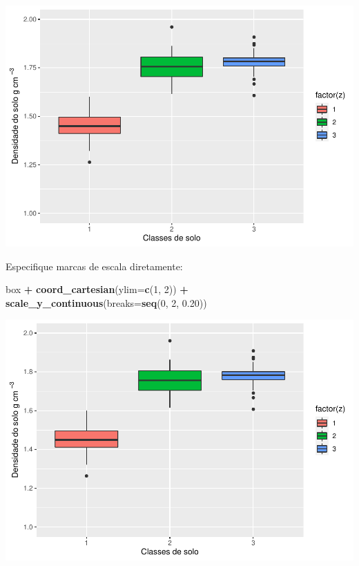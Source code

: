 \documentclass[
]{book}
\newenvironment{Shaded}{\begin{snugshade}}{\end{snugshade}}
\newcommand{\DataTypeTok}[1]{\textcolor[rgb]{0.13,0.29,0.53}{#1}}
\newcommand{\DecValTok}[1]{\textcolor[rgb]{0.00,0.00,0.81}{#1}}
\newcommand{\FloatTok}[1]{\textcolor[rgb]{0.00,0.00,0.81}{#1}}
\newcommand{\KeywordTok}[1]{\textcolor[rgb]{0.13,0.29,0.53}{\textbf{#1}}}
\newcommand{\NormalTok}[1]{#1}
\newcommand{\OperatorTok}[1]{\textcolor[rgb]{0.81,0.36,0.00}{\textbf{#1}}}
\newcommand{\StringTok}[1]{\textcolor[rgb]{0.31,0.60,0.02}{#1}}
\begin{document}
\includegraphics{TudodoR_files/figure-latex/unnamed-chunk-204-1.pdf}

Especifique marcas de escala diretamente:

\begin{Shaded}
\begin{Highlighting}[]
\NormalTok{box }\OperatorTok{+}\StringTok{ }\KeywordTok{coord_cartesian}\NormalTok{(}\DataTypeTok{ylim=}\KeywordTok{c}\NormalTok{(}\DecValTok{1}\NormalTok{, }\DecValTok{2}\NormalTok{)) }\OperatorTok{+}\StringTok{ }
\StringTok{    }\KeywordTok{scale_y_continuous}\NormalTok{(}\DataTypeTok{breaks=}\KeywordTok{seq}\NormalTok{(}\DecValTok{0}\NormalTok{, }\DecValTok{2}\NormalTok{, }\FloatTok{0.20}\NormalTok{))  }
\end{Highlighting}
\end{Shaded}

\includegraphics{TudodoR_files/figure-latex/unnamed-chunk-205-1.pdf}
\end{document}
